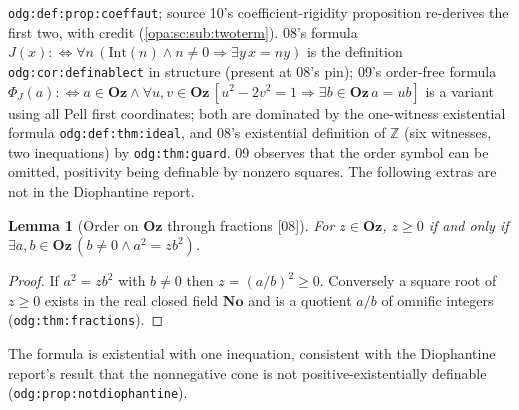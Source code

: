 \documentclass[11pt,oneside]{article}
\numberwithin{equation}{section}
\newtheorem{lemma}[lemma]{Lemma}
\theoremstyle{definition}
\theoremstyle{remark}
\newcommand{\No}{\mathbf{No}}
\newcommand{\Oz}{\mathbf{Oz}}
\newcommand{\Z}{\mathbb Z}
\newcommand{\src}[1]{\textup{\textsf{\small[#1]}}}
\newcommand{\lbl}[1]{\nolinkurl{#1}}
\begin{document}
\lbl{odg:def:prop:coeffaut}; source 10's coefficient-rigidity proposition
re-derives the first two, with credit (\cref{opa:sc:sub:twoterm}). 08's formula
$J(x):\Leftrightarrow\forall n\,(\mathrm{Int}(n)\wedge n\ne0\Rightarrow\exists y\,x=ny)$
is the definition \lbl{odg:cor:definablect} in structure (present at 08's pin);
09's order-free formula
$\Phi_J(a):\Leftrightarrow a\in\Oz\wedge\forall u,v\in\Oz\,[u^2-2v^2=1\Rightarrow\exists
b\in\Oz\,a=ub]$ is a variant using all Pell first coordinates; both are dominated
by the one-witness existential formula \lbl{odg:def:thm:ideal}, and 08's
existential definition of $\Z$ (six witnesses, two inequations) by
\lbl{odg:thm:guard}. 09 observes that the order symbol can be omitted, positivity
being definable by nonzero squares. The following extras are not in the
Diophantine report.

\begin{lemma}[Order on $\Oz$ through fractions \src{08}]\label{opa:lem:positive}
For $z\in\Oz$, $z\ge0$ if and only if $\exists a,b\in\Oz\,(b\ne0\wedge a^2=zb^2)$.
\end{lemma}
\begin{proof}
If $a^2=zb^2$ with $b\ne0$ then $z=(a/b)^2\ge0$. Conversely a square root of
$z\ge0$ exists in the real closed field $\No$ and is a quotient $a/b$ of omnific
integers (\lbl{odg:thm:fractions}).
\end{proof}

The formula is existential with one inequation, consistent with the Diophantine
report's result that the nonnegative cone is not positive-existentially
definable (\lbl{odg:prop:notdiophantine}).
\end{document}
